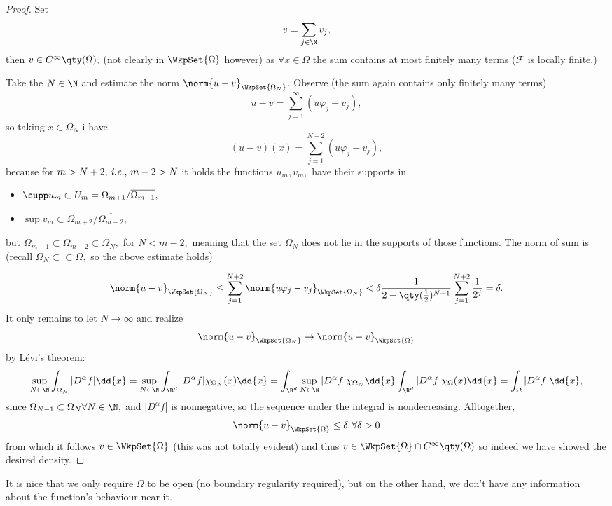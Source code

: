 \begin{proof}
	Set
	\[
		v = \sum_{j\in \N} v_j,
	\]
	then $v \in C^{\infty}\qty(\Omega),$ (not clearly in $\WkpSet{\Omega}$ however) as $\forall x \in \Omega$ the sum contains at most finitely many terms ($ \mathcal{F}$ is locally finite.)


	Take the $N \in \N$ and estimate the norm $\norm{u-v}_{\WkpSet{\Omega_N}}$. Observe (the sum again contains only finitely many terms)
	\[
		u-v = \sum_{j=1}^\infty(u \varphi_j - v_j),
	\]
	so taking $x \in \Omega_N$ i have
	\[
		(u-v)(x) = \sum_{j=1}^{N+2}(u \varphi_j - v_j),
	\]
		because for $m > N+2, \, \text{\textit{i.e.}}, \, m-2 >N$ it holds the functions $u_m, v_m, $ have their supports in
		\begin{itemize}
			\item $\supp u_m \subset U_m = \Omega_{m+1}/ \overline{\Omega_{m-1}},$
			\item $\sup v_m \subset \Omega_{m+2}/ \overline{\Omega_{m-2}},$
		\end{itemize}
		but $\Omega_{m-1} \subset \Omega_{m-2} \subset \Omega_N,$ for $N < m-2,$ meaning that the set $\Omega_N$ does not lie in the supports of those functions.
	The norm of sum is (recall $\Omega_N \subset \subset \Omega,$ so the above estimate holds)

	\begin{equation*}
		\norm{u-v}_{\WkpSet{\Omega_N}} \leq \sum_{j=1}^{N+2}\norm{u \varphi_j - v_j}_{\WkpSet{\Omega_N}} <\delta \frac{1}{2-\qty(\frac{1}{2})^{N+1}}\sum_{j=1}^{N+2} \frac{1}{2^j} = \delta.
	\end{equation*}
	It only remains to let $N \to \infty$ and realize
	\[
		\norm{u-v}_{\WkpSet{\Omega_N}} \to \norm{u-v}_{\WkpSet{\Omega}}
	\]
	by Lévi's theorem:
	\[
	\sup_{N\in \N}\int_{\Omega_N}|D^\alpha f| \dd{x} = \sup_{N \in \N}\int_{\R^d}|D^{\alpha}f|\chi_{\Omega_N}(x)\dd{x} = \int_{\R^d}\sup_{N \in \N}|D^{\alpha}f| \chi_{\Omega_N}\dd{x} \int_{\R^d}|D^\alpha f|\chi_{\Omega}(x)	\dd{x} = \int_{\Omega}|D^{\alpha}f|\dd{x},
	\]
	since $\Omega_{N-1} \subset \Omega_{N} \forall N \in \N,$ and $|D^{\alpha}f|$ is nonnegative, so the sequence under the integral is nondecreasing. Alltogether,
	\[
		\norm{u-v}_{\WkpSet{\Omega}}\leq \delta, \forall \delta>0
	\]
	from which it follows $v \in \WkpSet{\Omega}$ (this was not totally evident) and thus $v \in \WkpSet{\Omega} \cap C^{\infty}\qty(\Omega)$ so indeed we have showed the desired density.
\end{proof}

\begin{remark}
	It is nice that we only require $\Omega$ to be open (no boundary regularity required), but on the other hand, we don't have any information about the function's behaviour near it.
\end{remark}

